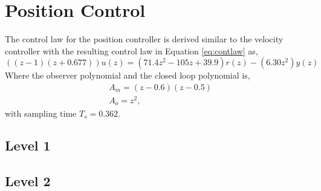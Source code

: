 \documentclass[12pt,a4paper]{article}
\begin{document}
\section*{Position Control}
  The control law for the position controller is derived similar to the
  velocity controller with the resulting control law in Equation
  \ref{eq:contlaw} as,
  \begin{equation}
      ((z-1)(z+0.677))u(z)=(71.4z^2-105z+39.9)r(z)-(6.30z^2)y(z)
  \end{equation}
  Where the observer polynomial and the closed loop polynomial is,
  \begin{align*}
        &A_m = (z-0.6)(z-0.5)\\
        &A_o = z^2,
  \end{align*}
  with sampling time $T_s=0.362$.
  \subsection*{Level 1}

  \subsection*{Level 2}
\end{document}
